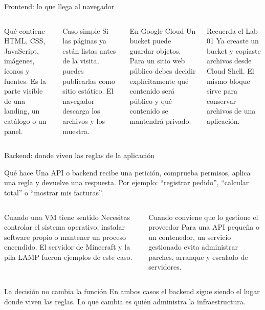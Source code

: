 \documentclass[aspectratio=169,10pt,c]{beamer}
\begin{document}
\begin{frame}{Frontend: lo que llega al navegador}
\begin{columns}[T,onlytextwidth]
\begin{block}{Qué contiene}
\small HTML, CSS, JavaScript, imágenes, íconos y fuentes. Es la parte visible de una landing, un catálogo o un panel.
\end{block}
\begin{exampleblock}{Caso simple}
\small Si las páginas ya están listas antes de la visita, puedes publicarlas como sitio estático. El navegador descarga los archivos y los muestra.
\end{exampleblock}
\begin{block}{En Google Cloud}
\small Un bucket puede guardar objetos. Para un sitio web público debes decidir explícitamente qué contenido será público y qué contenido se mantendrá privado.
\end{block}
\begin{alertblock}{Recuerda el Lab 01}
\small Ya creaste un bucket y copiaste archivos desde Cloud Shell. El mismo bloque sirve para conservar archivos de una aplicación.
\end{alertblock}
\end{columns}
\end{frame}

\begin{frame}{Backend: donde viven las reglas de la aplicación}
\begin{block}{Qué hace}
\small Una API o backend recibe una petición, comprueba permisos, aplica una regla y devuelve una respuesta. Por ejemplo: ``registrar pedido'', ``calcular total'' o ``mostrar mis facturas''.
\end{block}
\begin{columns}[T,onlytextwidth]
\begin{exampleblock}{Cuando una VM tiene sentido}
\small Necesitas controlar el sistema operativo, instalar software propio o mantener un proceso encendido. El servidor de Minecraft y la pila LAMP fueron ejemplos de este caso.
\end{exampleblock}
\begin{exampleblock}{Cuando conviene que lo gestione el proveedor}
\small Para una API pequeña o un contenedor, un servicio gestionado evita administrar parches, arranque y escalado de servidores.
\end{exampleblock}
\end{columns}
\par\vspace{2mm}
\begin{alertblock}{La decisión no cambia la función}
\small En ambos casos el backend sigue siendo el lugar donde viven las reglas. Lo que cambia es quién administra la infraestructura.
\end{alertblock}
\end{frame}
\end{document}
